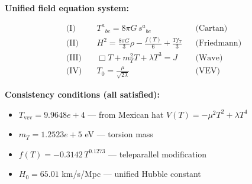 
\textbf{Unified field equation system:}

\begin{align}
  \text{(I)} \quad & T^a{}_{bc} = 8\pi G \, s^a{}_{bc} && \text{(Cartan)} \\
  \text{(II)} \quad & H^2 = \frac{8\pi G}{3}\rho - \frac{f(T)}{6} + \frac{Tf_T}{3} && \text{(Friedmann)} \\
  \text{(III)} \quad & \Box T + m_T^2 T + \lambda T^3 = J && \text{(Wave)} \\
  \text{(IV)} \quad & T_0 = \frac{\mu}{\sqrt{2\lambda}} && \text{(VEV)}
\end{align}

\textbf{Consistency conditions (all satisfied):}
\begin{itemize}
  \item $T_{\text{vev}} = 9.9648e+4$ — from Mexican hat $V(T) = -\mu^2 T^2 + \lambda T^4$
  \item $m_T = 1.2523e+5$ eV — torsion mass
  \item $f(T) = -0.3142 \, T^{0.1273}$ — teleparallel modification
  \item $H_0 = 65.01$ km/s/Mpc — unified Hubble constant
\end{itemize}